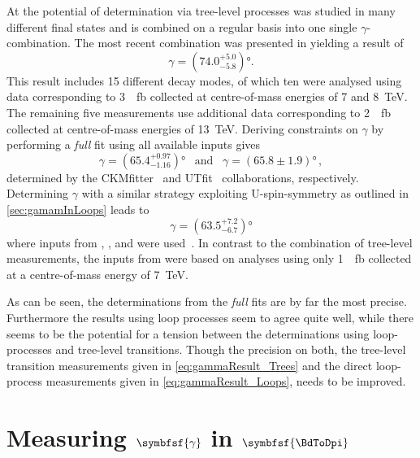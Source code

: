 At \lhcb the potential of determination via tree-level processes was studied in many different final states and is combined on a regular basis into one single $\gamma$-combination.
The most recent combination was presented in \cite{GammCombo} yielding a result of
\begin{equation}
\gamma=\left(74.0^{+5.0}_{-5.8}\right)\!\si{\degree}.\label{eq:gammaResult_Trees}
\end{equation}
This result includes \num{15} different decay modes, of which ten were analysed using data corresponding to \SI{3}{\per\femto\barn} collected at centre-of-mass energies of \num{7} and \SI{8}{\tera\electronvolt}.
The remaining five measurements use additional data corresponding to \SI{2}{\per\femto\barn} collected at centre-of-mass energies of \SI{13}{\tera\electronvolt}.
Deriving constraints on $\gamma$ by performing a \emph{full} fit using all available inputs gives
\begin{equation}
\gamma=\left(65.4^{+0.97}_{-1.16}\right)\!\si{\degree}\,\,\,\,\,\text{and}\,\,\,\,\,\gamma=\left(65.8\pm1.9\right)\!\si{\degree}\,,
\end{equation}
determined by the CKMfitter~\cite{CKMfitter2015} and UTfit~\cite{UTfit-UT} collaborations, respectively.
Determining $\gamma$ with a similar strategy exploiting U-spin-symmetry as outlined in \cref{sec:gamamInLoops} leads to
\begin{equation}
\gamma=\left(63.5^{+7.2}_{-6.7}\right)\!\si{\degree}\label{eq:gammaResult_Loops}
\end{equation}
where inputs from \babar, \belle, \cdf and \lhcb were used~\cite{Aaij:2014xba}. In contrast to the combination of tree-level measurements, the inputs from \lhcb were based on analyses using only \SI{1}{\per\femto\barn} collected at a centre-of-mass energy of \SI{7}{\tera\electronvolt}.

As can be seen, the determinations from the \emph{full} fits are by far the most precise.
Furthermore the results using loop processes seem to agree quite well, while there seems to be the potential for a tension between the determinations using loop-processes and tree-level transitions.
Though the precision on both, the tree-level transition measurements given in \cref{eq:gammaResult_Trees} and the direct loop-process measurements given in \cref{eq:gammaResult_Loops}, needs to be improved.

\section[head={Measuring $\gamma$ in $\BdToDpi$},tocentry={Measuring $\gamma$ in $\BdToDpi$}]{Measuring $\symbfsf{\gamma}$ in $\symbfsf{\BdToDpi}$}
\label{sec:GammaInBd2Dpi}

